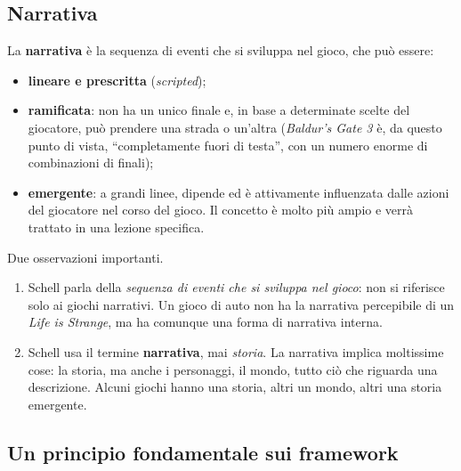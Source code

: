 \subsection{Narrativa}

La \textbf{narrativa} è la sequenza di eventi che si sviluppa nel gioco, che
può essere:
\begin{itemize}
  \item \textbf{lineare e prescritta} (\emph{scripted});
  \item \textbf{ramificata}: non ha un unico finale e, in base a determinate
        scelte del giocatore, può prendere una strada o un'altra
        (\emph{Baldur's Gate 3} è, da questo punto di vista, ``completamente
        fuori di testa'', con un numero enorme di combinazioni di finali);
  \item \textbf{emergente}: a grandi linee, dipende ed è attivamente
        influenzata dalle azioni del giocatore nel corso del gioco. Il concetto
        è molto più ampio e verrà trattato in una lezione specifica.
\end{itemize}

Due osservazioni importanti.
\begin{enumerate}
  \item Schell parla della \emph{sequenza di eventi che si sviluppa nel
        gioco}: non si riferisce solo ai giochi narrativi. Un gioco di auto
        non ha la narrativa percepibile di un \emph{Life is Strange}, ma ha
        comunque una forma di narrativa interna.
  \item Schell usa il termine \textbf{narrativa}, mai \emph{storia}. La
        narrativa implica moltissime cose: la storia, ma anche i personaggi, il
        mondo, tutto ciò che riguarda una descrizione. Alcuni giochi hanno una
        storia, altri un mondo, altri una storia emergente.
\end{enumerate}

\subsection{Un principio fondamentale sui framework}

